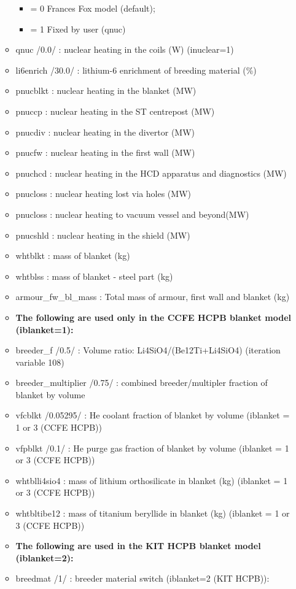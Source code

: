 \documentclass[]{article}
\providecommand{\tightlist}{%
  \setlength{\itemsep}{0pt}\setlength{\parskip}{0pt}}
\begin{document}
\begin{itemize}
\begin{itemize}
    \begin{itemize}
    \tightlist
    \item
      = 0 Frances Fox model (default);
    \item
      = 1 Fixed by user (qnuc)
    \end{itemize}
  \item
    qnuc /0.0/ : nuclear heating in the coils (W) (inuclear=1)
  \item
    li6enrich /30.0/ : lithium-6 enrichment of breeding material (\%)
  \item
    pnucblkt : nuclear heating in the blanket (MW)
  \item
    pnuccp : nuclear heating in the ST centrepost (MW)
  \item
    pnucdiv : nuclear heating in the divertor (MW)
  \item
    pnucfw : nuclear heating in the first wall (MW)
  \item
    pnuchcd : nuclear heating in the HCD apparatus and diagnostics (MW)
  \item
    pnucloss : nuclear heating lost via holes (MW)
  \item
    pnucloss : nuclear heating to vacuum vessel and beyond(MW)
  \item
    pnucshld : nuclear heating in the shield (MW)
  \item
    whtblkt : mass of blanket (kg)
  \item
    whtblss : mass of blanket - steel part (kg)
  \item
    armour\_fw\_bl\_mass : Total mass of armour, first wall and blanket
    (kg)
  \item
    \textbf{The following are used only in the CCFE HCPB blanket model
    (iblanket=1):}
  \item
    breeder\_f /0.5/ : Volume ratio: Li4SiO4/(Be12Ti+Li4SiO4) (iteration
    variable 108)
  \item
    breeder\_multiplier /0.75/ : combined breeder/multipler fraction of
    blanket by volume
  \item
    vfcblkt /0.05295/ : He coolant fraction of blanket by volume
    (iblanket = 1 or 3 (CCFE HCPB))
  \item
    vfpblkt /0.1/ : He purge gas fraction of blanket by volume (iblanket
    = 1 or 3 (CCFE HCPB))
  \item
    whtblli4sio4 : mass of lithium orthosilicate in blanket (kg)
    (iblanket = 1 or 3 (CCFE HCPB))
  \item
    whtbltibe12 : mass of titanium beryllide in blanket (kg) (iblanket =
    1 or 3 (CCFE HCPB))
  \item
    \textbf{The following are used in the KIT HCPB blanket model
    (iblanket=2):}
  \item
    breedmat /1/ : breeder material switch (iblanket=2 (KIT HCPB)):


\end{itemize}
\end{itemize}
\end{document}
